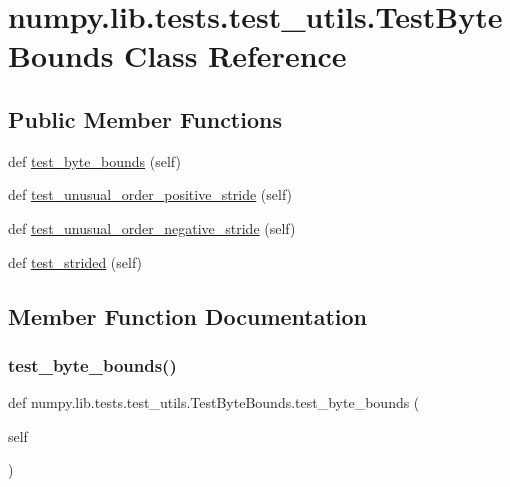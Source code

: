 \hypertarget{classnumpy_1_1lib_1_1tests_1_1test__utils_1_1TestByteBounds}{}\section{numpy.\+lib.\+tests.\+test\+\_\+utils.\+Test\+Byte\+Bounds Class Reference}
\label{classnumpy_1_1lib_1_1tests_1_1test__utils_1_1TestByteBounds}
\subsection*{Public Member Functions}
\begin{DoxyCompactItemize}
\item 
def \hyperlink{classnumpy_1_1lib_1_1tests_1_1test__utils_1_1TestByteBounds_a5165508ef996f370d15f5cf42e92f005}{test\+\_\+byte\+\_\+bounds} (self)
\item 
def \hyperlink{classnumpy_1_1lib_1_1tests_1_1test__utils_1_1TestByteBounds_a0ce13ca66ea1cbe6de155a02c7af9c09}{test\+\_\+unusual\+\_\+order\+\_\+positive\+\_\+stride} (self)
\item 
def \hyperlink{classnumpy_1_1lib_1_1tests_1_1test__utils_1_1TestByteBounds_add1b33ad349395302af322fe554a6a7c}{test\+\_\+unusual\+\_\+order\+\_\+negative\+\_\+stride} (self)
\item 
def \hyperlink{classnumpy_1_1lib_1_1tests_1_1test__utils_1_1TestByteBounds_a23f3657c0a030ac9698c836c37147bb2}{test\+\_\+strided} (self)
\end{DoxyCompactItemize}


\subsection{Member Function Documentation}
\mbox{\label{classnumpy_1_1lib_1_1tests_1_1test__utils_1_1TestByteBounds_a5165508ef996f370d15f5cf42e92f005}} 
\subsubsection{\texorpdfstring{test\+\_\+byte\+\_\+bounds()}{test\_byte\_bounds()}}
{\footnotesize\ttfamily def numpy.\+lib.\+tests.\+test\+\_\+utils.\+Test\+Byte\+Bounds.\+test\+\_\+byte\+\_\+bounds (\begin{DoxyParamCaption}\item[{}]{self }\end{DoxyParamCaption})}

